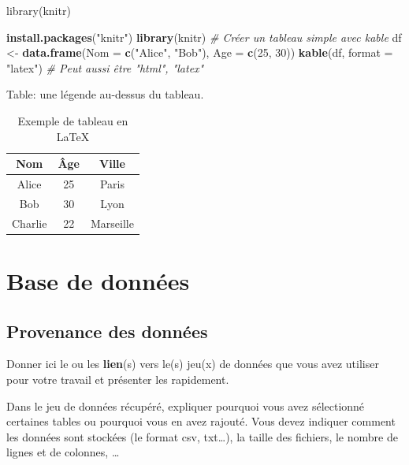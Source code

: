 \documentclass[mstat,12pt]{unswthesis}
\newenvironment{Shaded}{\begin{snugshade}}{\end{snugshade}}
\newcommand{\AttributeTok}[1]{\textcolor[rgb]{0.13,0.29,0.53}{#1}}
\newcommand{\CommentTok}[1]{\textcolor[rgb]{0.56,0.35,0.01}{\textit{#1}}}
\newcommand{\DecValTok}[1]{\textcolor[rgb]{0.00,0.00,0.81}{#1}}
\newcommand{\FunctionTok}[1]{\textcolor[rgb]{0.13,0.29,0.53}{\textbf{#1}}}
\newcommand{\NormalTok}[1]{#1}
\newcommand{\OtherTok}[1]{\textcolor[rgb]{0.56,0.35,0.01}{#1}}
\newcommand{\StringTok}[1]{\textcolor[rgb]{0.31,0.60,0.02}{#1}}
\begin{document}
library(knitr)

\begin{Shaded}
\begin{Highlighting}[]
\FunctionTok{install.packages}\NormalTok{(}\StringTok{"knitr"}\NormalTok{)}
\FunctionTok{library}\NormalTok{(knitr)}
\CommentTok{\# Créer un tableau simple avec kable}
\NormalTok{df }\OtherTok{\textless{}{-}} \FunctionTok{data.frame}\NormalTok{(}\AttributeTok{Nom =} \FunctionTok{c}\NormalTok{(}\StringTok{"Alice"}\NormalTok{, }\StringTok{"Bob"}\NormalTok{), }\AttributeTok{Age =} \FunctionTok{c}\NormalTok{(}\DecValTok{25}\NormalTok{, }\DecValTok{30}\NormalTok{))}
\FunctionTok{kable}\NormalTok{(df, }\AttributeTok{format =} \StringTok{"latex"}\NormalTok{) }\CommentTok{\# Peut aussi être "html", "latex"}
\end{Highlighting}
\end{Shaded}

Table: une légende au-dessus du tableau. \label{tab7.1}

\begin{table}[h]
    \centering
    \begin{tabular}{|c|c|c|}
        \hline
        Nom & Âge & Ville \\
        \hline
        Alice & 25 & Paris \\
        Bob & 30 & Lyon \\
        Charlie & 22 & Marseille \\
        \hline
    \end{tabular}
    \caption{Exemple de tableau en LaTeX}
    \label{tab:exemple}
\end{table}

\chapter{Base de données}\label{base-de-donnuxe9es}

\section{Provenance des données}\label{provenance-des-donnuxe9es}

Donner ici le ou les \textbf{lien}(s) vers le(s) jeu(x) de données que
vous avez utiliser pour votre travail et présenter les rapidement.

\bigskip

Dans le jeu de données récupéré, expliquer pourquoi vous avez
sélectionné certaines tables ou pourquoi vous en avez rajouté. Vous
devez indiquer comment les données sont stockées (le format csv,
txt\ldots), la taille des fichiers, le nombre de lignes et de colonnes,
\ldots{}
\end{document}
